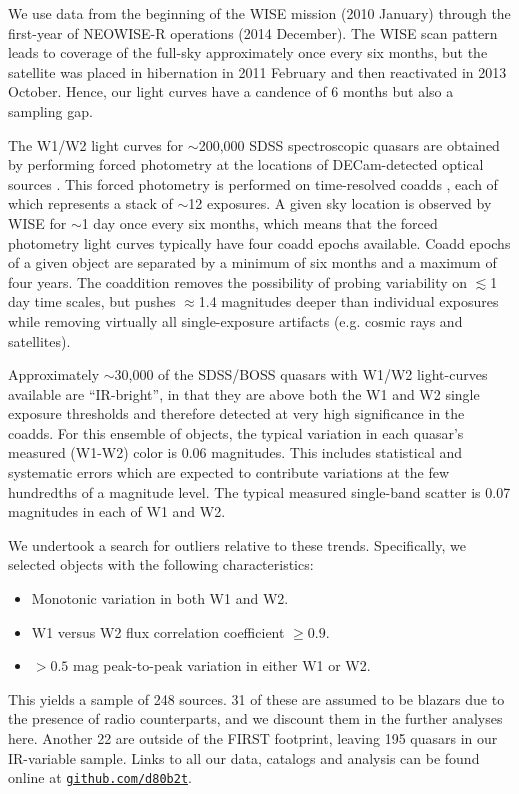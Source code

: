 \documentclass[11pt,a4paper]{article}
\begin{document}
We use data from the beginning of the WISE mission (2010 January) through the first-year of NEOWISE-R operations (2014 December). The WISE scan pattern leads to coverage of the full-sky approximately once every six months, but the satellite was placed in hibernation in 2011 February and then reactivated in 2013 October. Hence, our light curves have a candence of 6 months but also a sampling gap. 

The W1/W2 light curves for $\sim$200,000 SDSS spectroscopic quasars are obtained by performing forced photometry at the locations of DECam-detected optical sources \citep{Lang2014, Meisner2017a, Meisner2017b}. This forced photometry is performed on time-resolved coadds \citep{Lang2014}, each of which represents a stack of $\sim$12 exposures. A given sky location is observed by WISE for $\sim$1 day once every six months, which means that the forced photometry light curves typically have four coadd epochs available. Coadd epochs of a given object are separated by a minimum of six months and a maximum of four years. The coaddition removes the possibility of probing variability on $\lesssim$1 day time scales, but pushes $\approx$1.4 magnitudes deeper than individual exposures while removing virtually all single-exposure artifacts (e.g. cosmic rays and satellites).

Approximately $\sim$30,000 of the SDSS/BOSS quasars with W1/W2 light-curves available are ``IR-bright'', in that they are above both the W1 and W2 single exposure thresholds and therefore detected at very high significance in the coadds. For this ensemble of objects, the typical variation in each quasar's measured (W1-W2) color is 0.06 magnitudes.  This includes statistical and systematic errors which are expected to contribute variations at the few hundredths of a magnitude level. The typical measured single-band scatter is 0.07 magnitudes in each of W1 and W2.

We undertook a search for outliers relative to these trends. Specifically, we selected objects with the following characteristics:
\begin{itemize}
    \item Monotonic variation in both W1 and W2.
    \item W1 versus W2 flux correlation coefficient $\geq0.9$.
    \item $>0.5$ mag peak-to-peak variation in either W1 or W2.
\end{itemize}
This yields a sample of 248 sources. 31 of these are assumed to be blazars due to the presence of 
\citep[FIRST; ][]{Becker1995} radio counterparts, and we discount them in the further analyses here. Another 22 are outside of the FIRST footprint, leaving 195 quasars in our IR-variable sample. Links to all our data, catalogs and analysis can be found online at \href{https://github.com/d80b2t}{{\tt github.com/d80b2t}}.
\end{document}
